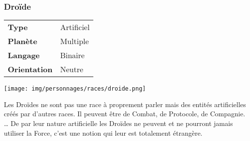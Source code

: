 \subsubsection{Droïde}
\begin{samepage}
	\vspace{4\baselineskip}
	\begin{tabular}{ l l }
		\textbf{Type} 			& Artificiel \\
	   	\textbf{Planète} 		& Multiple \\
	   	\textbf{Langage} 		& Binaire \\
	   	\textbf{Orientation} 	& Neutre \\
	\end{tabular}

	\vspace{-11\baselineskip}

	\begin{flushright}
		\texttt{[image: img/personnages/races/droide.png]}
	\end{flushright}
	\vspace{-2\baselineskip}
\end{samepage}

Les Droïdes ne sont pas une race à proprement parler mais des entités artificielles créés par d’autres races. Il peuvent être de Combat, de Protocole, de Compagnie. \ldots 
De par leur nature artificielle les Droïdes ne peuvent et ne pourront jamais utiliser la Force, c’est une notion qui leur est totalement étrangère.

